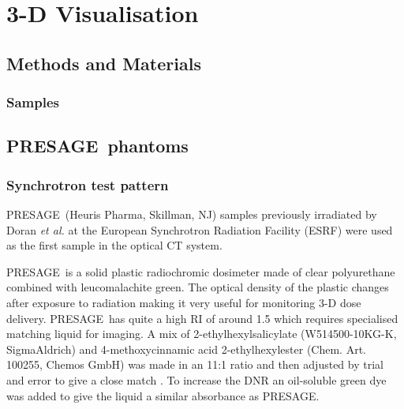 	\section{3-D Visualisation}
	\label{sec:3dvis}
	\subsection{Methods and Materials}
	\subsubsection{Samples}
	
	\subsection{PRESAGE\texttrademark ~phantoms}
	\label{subsec:presage}
	
	\subsubsection{Synchrotron test pattern}
	
	PRESAGE\texttrademark ~(Heuris Pharma, Skillman, NJ) samples previously irradiated by Doran \textit{et al.} at the European Synchrotron Radiation Facility (ESRF) were used as the first sample in the optical CT system. \cite{doranestablishing2013}
	
	
	
	
	PRESAGE\texttrademark ~is a solid plastic radiochromic dosimeter  made of clear polyurethane combined with leucomalachite green. \cite{adamovics2003new} The optical density of the plastic changes after exposure to radiation making it very useful for monitoring 3-D dose delivery. PRESAGE\texttrademark ~has quite a high RI of around 1.5 which requires specialised matching liquid for imaging. 
	A  mix of  2-ethylhexylsalicylate (W514500-10KG-K, SigmaAldrich)
	and 4-methoxycinnamic acid 2-ethylhexylester (Chem.   Art.   100255, Chemos GmbH) %
	was made in an 11:1 ratio and then adjusted by trial and error to give a close match \cite{AbdulRahman:2011eqa}.
	To increase the DNR an oil-soluble green dye was added to give the liquid a similar absorbance as PRESAGE\texttrademark.
	
	
